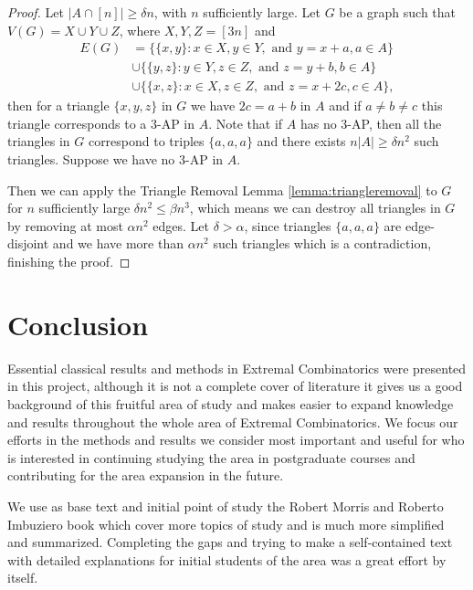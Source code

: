 \documentclass[12pt,twoside,a4paper,bibliography=totocnumbered]{book}
\numberwithin{equation}{section}
\theoremstyle{remark}
\begin{document}
\begin{proof}
Let $|A \cap [n]| \geq \delta n$, with $n$ sufficiently large. Let $G$ be a graph such that $V(G) = X\cup Y \cup Z$, where $X, Y, Z = [3n]$ and
\begin{align*}
E(G) &= \{\{x,y\}\colon x \in X, y \in Y,\text{ and } y = x + a, a \in A\} \\
& \cup \{\{y,z\} \colon y \in Y, z \in Z, \text{ and } z = y + b, b \in A\}\\
& \cup \{\{x,z\} \colon x \in X, z \in Z, \text{ and } z = x +2c, c\in A\},
\end{align*}
then for a triangle $\{x,y,z\}$ in $G$ we have $2c = a+b$ in $A$ and if $a \neq b \neq c$ this triangle corresponds to a $3$-AP in $A$.
Note that if $A$ has no $3$-AP, then all the triangles in $G$ correspond to triples $\{a,a,a\}$ and there exists $n|A| \geq \delta n^2$ such triangles. Suppose we have no $3$-AP in $A$.
 
Then we can apply the Triangle Removal Lemma \ref{lemma:triangleremoval} to $G$ for $n$ sufficiently large $\delta n^2 \leq \beta n^3 $, which means we can destroy all triangles in $G$ by removing at most $\alpha n^2$ edges. Let $\delta > \alpha$, since triangles $\{a,a,a\}$ are edge-disjoint and we have more than $\alpha n^2 $ such triangles which is a contradiction, finishing the proof.
\end{proof}

\chapter{Conclusion}
Essential classical results and methods in Extremal Combinatorics were presented in this project, although it is not a complete cover of literature it gives us a good background of this fruitful area of study and makes easier to expand knowledge and results throughout the whole area of Extremal Combinatorics. We focus our efforts in the methods and results we consider most important and useful for who is interested in continuing studying the area in postgraduate courses and contributing for the area expansion in the future.

We use as base text and initial point of study the Robert Morris and Roberto Imbuziero book \cite{RoRo11} which cover more topics of study and is much more simplified and	 summarized. Completing the gaps and trying to make a self-contained text with detailed explanations for initial students of the area was a great effort by itself.






\end{document}
